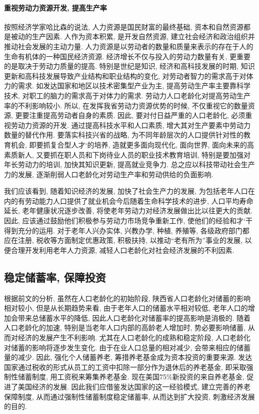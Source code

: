 \documentclass[a4paper, 12pt, UTF8]{article}
\begin{document}
\paragraph{重视劳动力资源开发,  提高生产率}
按照经济学家哈比森的说法, 人力资源是国民财富的最终基础, 资本和自然资源都是被动的生产因素. 人作为资本积累, 是开发自然资源, 建立社会经济和政治组织并推动社会发展的主动力量. 人力资源是以劳动者的数量和质量来表示的存在于人的生命有机体的一种国民经济资源. 经济增长不仅与投入的劳动力数量有关, 更重要的是取决于劳动力质量的提高. 特别是世纪是知识, 经济和高科技发展的时期, 知识更新和高科技发展导致产业结构和职业结构的变化, 对劳动者智力的需求高于对体力的需求. 如发达国家和地区以技术密集型产业为主, 提高劳动生产率主要靠科学技术, 对职工的脑力的需求高于对体力的需求. 劳动力人口老龄化对提高劳动生产率的不利影响较小. 所以, 在发挥我省劳动力资源优势的时候, 不仅重视它的数量资源, 更要注重提高劳动者自身的素质. 因此, 要对付日益严重的人口老龄化, 必须重视劳动力资源的开发. 通过提高科技水平和人口素质, 增大其对生产要素中劳动力数量的替代作用. 要落实科技兴省的战略, 为不同年龄层次的人口提供针对性的教育机会, 即要抓复合型人才`的培养, 造就更多面向现代化, 面向世界, 面向未来的高素质新人, 又要抓在职人员和下岗待业人员的职业技术教育培训, 特别是要加强对年长劳动力的培训, 加快其知识更新, 提高就业竞争力. 总之应以科技带动社会生产力的发展, 逐渐削弱人口老龄化对劳动生产率和劳动供给的负面影响. 

我们应该看到, 随着知识经济的发展, 加快了社会生产力的发展, 为包括老年人口在内的有劳动能力人口提供了就业机会今后随着生命科学技术的进步, 人口平均寿命延长, 老年健康状况逐步改善, 将使老年劳动力对经济发展做出比以往更大的贡献. 因此, 应该通过鼓励他们积极参与劳动力市场竞争重新工作, 使他们的经验和才`干得到充分的运用. 对于老年人兴办实体, 兴教办学, 种植, 养殖等, 各级政府部门都应在注册, 税收等方面制定优惠政策, 积极扶持, 以推动“老有所为”事业的发展, 以便合理开发利用老年人力资源, 减轻人口老龄化对社会经济发展的不利因素. 

\subsection{稳定储蓄率,  保障投资}
根据前文的分析, 虽然在人口老龄化的初始阶段, 陕西省人口老龄化对储蓄的影响相对较小, 但是从长期趋势来看, 由于老年人口的储蓄水平相对较低, 老年人口的增加会带来总储蓄水平的降低, 因此人口老龄化对储蓄率的提高影响是消极的. 随着人口老龄化的加速, 特别是当老年人口内部的高龄老人增加时, 势必要影响储蓄, 从而对经济的发展产生不利影响. 尤其在人口老龄化的成熟和稳定阶段, 人口老龄化对储蓄的影响将逐步发生变化. 由于在业人口总量的相对减少, 会带来相应的储蓄量的减少. 因此, 强化个人储蓄养老, 筹措养老基金成为资本投资的重要来源. 发达国家通过税收的形式从员工的工资中扣除一部分作为退休后的养老基金, 即采取强制性储蓄制度, 用工资税来筹集养老基金. 现在美国75\%新投资的来自养老基金, 促进了美国经济的发展. 因此我们应借鉴发达国家的这一经验模式, 建立完善的养老保障制度, 从而通过强制性储蓄制度稳定储蓄率, 从而达到扩大投资, 刺激经济发展的目的.
\end{document}
